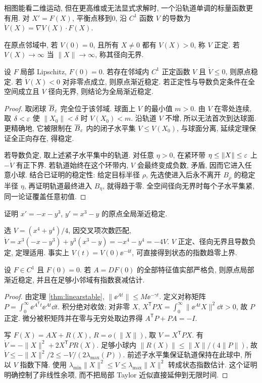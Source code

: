 相图能看二维运动, 但在更高维或无法显式求解时, 一个沿轨道单调的标量函数更有用. 对 $X'=F(X)$, 平衡点移到0, 沿 $C^1$ 函数 $V$ 的导数为 $\dot V(X)=\nabla V(X)\cdot F(X)$.
\begin{definition}
在原点邻域中, 若 $V(0)=0$, 且所有 $X\ne0$ 都有 $V(X)>0$, 称 $V$ 正定. 若 $V(X)\to\infty$ 当 $\|X\|\to\infty$, 称其径向无界.
\end{definition}
\begin{theorem}\label{thm:lyapunov}
设 $F$ 局部 Lipschitz, $F(0)=0$. 若存在邻域内 $C^1$ 正定函数 $V$ 且 $\dot V\le0$, 则原点稳定. 若 $\dot V(X)<0$ 对非零点成立, 则原点渐近稳定. 若正定性与导数负定条件在全空间成立且 $V$ 径向无界, 则结论为全局渐近稳定.
\end{theorem}
\begin{proof}
取闭球 $\overline B_\varepsilon$ 完全位于该邻域. 球面上 $V$ 的最小值 $m>0$. 由 $V$ 在零处连续, 取 $\delta<\varepsilon$ 使 $\|X_0\|<\delta$ 时 $V(X_0)<m$. 沿轨道 $V$ 不增, 所以无法首次到达球面. 更精确地, 它被限制在 $\overline B_\varepsilon$ 内的闭子水平集 $V\le V(X_0)$, 与球面分离, 延续定理保证全正向存在, 得稳定.

若导数负定, 取上述紧子水平集中的轨道. 对任意 $\eta>0$, 在紧环带 $\eta\le\|X\|\le\varepsilon$ 上 $-\dot V$ 有正下界. 若轨道始终在这个环带内, $V$ 会最终变成负数, 矛盾, 因而它进入任意小球. 结合已证明的稳定性: 给定目标半径 $\rho$, 先选使进入后永不离开 $B_\rho$ 的稳定半径 $\eta$, 再证明轨道最终进入 $B_\eta$, 就得趋于零. 全空间径向无界时每个子水平集紧, 同一论证覆盖任意初值.
\end{proof}
\begin{example}证明 $x'=-x-y^3$, $y'=x^3-y$ 的原点全局渐近稳定.\end{example}
\begin{solution}
选 $V=(x^4+y^4)/4$, 因交叉项次数匹配,
$\dot V=x^3(-x-y^3)+y^3(x^3-y)=-x^4-y^4=-4V$. $V$ 正定、径向无界且导数负定, 定理适用. 事实上 $V(t)=V(0)\ee^{-4t}$, 可直接得到状态的指数趋零上界.
\end{solution}
\begin{theorem}\label{thm:nonlinearstable}
设 $F\in C^1$ 且 $F(0)=0$. 若 $A=DF(0)$ 的全部特征值实部严格负, 则原点局部渐近稳定, 并且在足够小邻域有指数衰减估计.
\end{theorem}
\begin{proof}
由定理 \ref{thm:linearstable}, $\|\ee^{At}\|\le M\ee^{-\gamma t}$. 定义对称矩阵
$P=\int_0^\infty\ee^{A^{\mathsf T}t}\ee^{At}\dd t$. 积分绝对收敛; 对非零 $X$, $X^{\mathsf T}PX=\int_0^\infty\|\ee^{At}X\|^2\dd t>0$, 故 $P$ 正定. 微分被积矩阵并在零与无穷处取边界得 $A^{\mathsf T}P+PA=-I$.

写 $F(X)=AX+R(X)$, $R=o(\|X\|)$, 取 $V=X^{\mathsf T}PX$. 有
$\dot V=-\|X\|^2+2X^{\mathsf T}PR(X)$. 足够小球内 $\|R(X)\|\le\|X\|/(4\|P\|)$, 故 $\dot V\le-\|X\|^2/2\le-V/(2\lambda_{\max}(P))$. 前述子水平集保证轨道保持在此球中, 所以 $V$ 指数下降. 使用 $\lambda_{\min}\|X\|^2\le V\le\lambda_{\max}\|X\|^2$ 转成状态指数估计. 这个证明明确控制了非线性余项, 而不把局部 Taylor 近似直接延伸到无限时间.
\end{proof}
